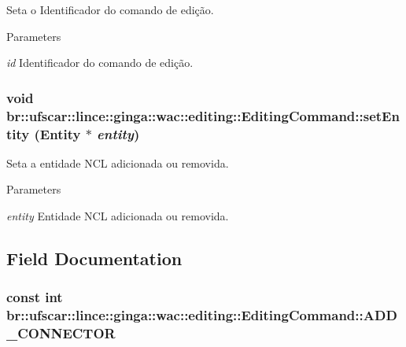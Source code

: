 Seta o Identificador do comando de edição. 


\begin{DoxyParams}{Parameters}
\item[{\em id}]Identificador do comando de edição. \end{DoxyParams}
\hypertarget{classbr_1_1ufscar_1_1lince_1_1ginga_1_1wac_1_1editing_1_1EditingCommand_a3fea7b04ec69d0e6c45488728342859a}{
\subsubsection[{setEntity}]{\setlength{\rightskip}{0pt plus 5cm}void br::ufscar::lince::ginga::wac::editing::EditingCommand::setEntity (Entity $\ast$ {\em entity})}}
\label{classbr_1_1ufscar_1_1lince_1_1ginga_1_1wac_1_1editing_1_1EditingCommand_a3fea7b04ec69d0e6c45488728342859a}


Seta a entidade NCL adicionada ou removida. 


\begin{DoxyParams}{Parameters}
\item[{\em entity}]Entidade NCL adicionada ou removida. \end{DoxyParams}


\subsection{Field Documentation}
\hypertarget{classbr_1_1ufscar_1_1lince_1_1ginga_1_1wac_1_1editing_1_1EditingCommand_a78eb46d12ac97acda15cc25cad21e5b7}{
\subsubsection[{ADD\_\-CONNECTOR}]{\setlength{\rightskip}{0pt plus 5cm}const int {\bf br::ufscar::lince::ginga::wac::editing::EditingCommand::ADD\_\-CONNECTOR}}}
\label{classbr_1_1ufscar_1_1lince_1_1ginga_1_1wac_1_1editing_1_1EditingCommand_a78eb46d12ac97acda15cc25cad21e5b7}


